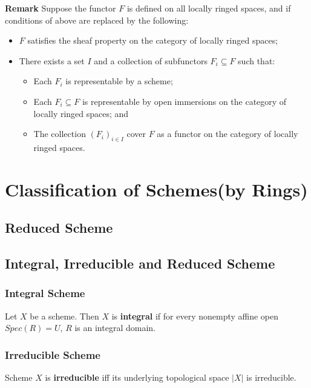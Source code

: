 \documentclass[Total.tex]{subfiles}
\begin{document}
			\textbf{Remark} Suppose the functor $F$ is defined on all locally ringed spaces, and if conditions of above are replaced by the following:
			\begin{itemize}
				\item $F$ satisfies the sheaf property on the category of locally ringed spaces;
				\item There exists a set $I$ and a collection of subfunctors $F_i\subseteq F$ such that:
				\begin{itemize}
					\item Each $F_i$ is representable by a scheme;
					\item Each $F_i\subseteq F$ is representable by open immersions on the category of locally ringed spaces; and
					\item The collection $(F_i)_{i\in I}$ cover $F$ as a functor on the category of locally ringed spaces.
				\end{itemize}
			\end{itemize}
		\section{Classification of Schemes(by Rings)}
			
			\subsection{Reduced Scheme}
			
				
				\subsection{Integral, Irreducible and Reduced Scheme}
					
					\subsubsection{Integral Scheme}
						\begin{Def}
							Let $X$ be a scheme. Then $X$ is \textbf{integral} if for every nonempty affine open $Spec(R)=U$, $R$ is an integral domain.
						\end{Def}
						
					\subsubsection{Irreducible Scheme}
						\begin{Def}
							Scheme $X$ is \textbf{irreducible} iff its underlying topological space $|X|$ is irreducible.
						\end{Def}
						
\end{document}
